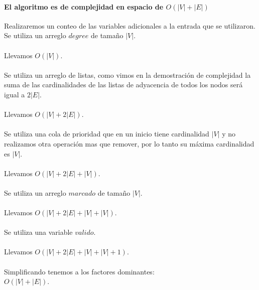\documentclass[12pt]{article}
\begin{document}
\paragraph{El algoritmo es de complejidad en espacio de $O(|V| + |E|)$}
Realizaremos un conteo de las variables adicionales a la entrada que se utilizaron.\\
Se utiliza un arreglo $degree$ de tamaño $|V|$.\\\\
Llevamos $O(|V|)$.\\\\
Se utiliza un arreglo de listas, como vimos en la demostración de complejidad la suma de las cardinalidades de las listas de adyacencia  de todos los nodos será igual a $2|E|$.\\\\
Llevamos $O(|V| + 2|E|)$.\\\\
Se utiliza una cola de prioridad que en un inicio tiene cardinalidad $|V|$ y no realizamos otra operación mas que remover, por lo tanto su máxima cardinalidad es $|V|$.\\\\
Llevamos $O(|V| + 2|E| + |V|)$.\\\\
Se utiliza un arreglo $marcado$ de tamaño $|V|$.\\\\
Llevamos $O(|V| + 2|E| + |V| + |V|)$.\\\\
Se utiliza una variable $valido$.\\\\
Llevamos $O(|V| + 2|E| + |V| + |V| + 1)$.\\\\
Simplificando tenemos a los factores dominantes: \\
$O(|V| + |E|)$.\\
\pagebreak
\end{document}
